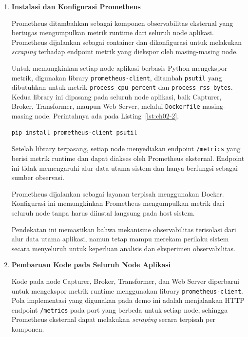 \begin{enumerate}
  \item \textbf{Instalasi dan Konfigurasi Prometheus}  

Prometheus ditambahkan sebagai komponen observabilitas eksternal yang bertugas mengumpulkan metrik runtime dari seluruh node aplikasi. Prometheus dijalankan sebagai container dan dikonfigurasi untuk melakukan \emph{scraping} terhadap endpoint metrik yang diekspor oleh masing-masing node.

Untuk memungkinkan setiap node aplikasi berbasis Python mengekspor metrik, digunakan library \texttt{prometheus-client}, ditambah \texttt{psutil} yang dibutuhkan untuk metrik \texttt{process\_cpu\_percent} dan \texttt{process\_rss\_bytes}. Kedua library ini dipasang pada seluruh node aplikasi, baik Capturer, Broker, Transformer, maupun Web Server, melalui \texttt{Dockerfile} masing-masing node. Perintahnya ada pada Listing~\ref{lst:ch02-2}.

\begin{lstlisting}[language=bash, caption={Memasang dependensi Python (2)}, label={lst:ch02-2}]
pip install prometheus-client psutil
\end{lstlisting}

Setelah library terpasang, setiap node menyediakan endpoint \texttt{/metrics} yang berisi metrik runtime dan dapat diakses oleh Prometheus eksternal. Endpoint ini tidak memengaruhi alur data utama sistem dan hanya berfungsi sebagai sumber observasi.

Prometheus dijalankan sebagai layanan terpisah menggunakan Docker. Konfigurasi ini memungkinkan Prometheus mengumpulkan metrik dari seluruh node tanpa harus diinstal langsung pada host sistem.


Pendekatan ini memastikan bahwa mekanisme observabilitas terisolasi dari alur data utama aplikasi, namun tetap mampu merekam perilaku sistem secara menyeluruh untuk keperluan analisis dan eksperimen observabilitas.


  \item \textbf{Pembaruan Kode pada Seluruh Node Aplikasi}  

Kode pada node Capturer, Broker, Transformer, dan Web Server diperbarui untuk mengekspor metrik runtime menggunakan library \texttt{prometheus-client}. Pola implementasi yang digunakan pada demo ini adalah menjalankan HTTP endpoint \texttt{/metrics} pada port yang berbeda untuk setiap node, sehingga Prometheus eksternal dapat melakukan \emph{scraping} secara terpisah per komponen.


\end{enumerate}
